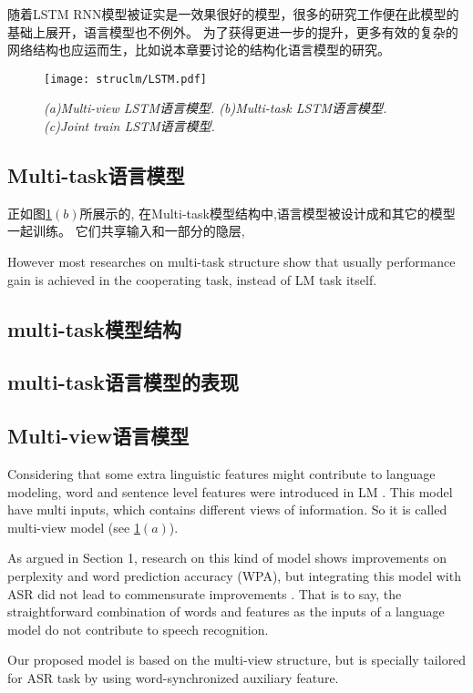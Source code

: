 随着LSTM RNN模型被证实是一效果很好的模型，很多的研究工作便在此模型的基础上展开，语言模型也不例外。
为了获得更进一步的提升，更多有效的复杂的网络结构也应运而生，比如说本章要讨论的结构化语言模型的研究。


 \begin{figure}[tbhp!]
    \small
    \centering
    \texttt{[image: struclm/LSTM.pdf]}
    \caption{{\it (a)Multi-view LSTM语言模型. (b)Multi-task LSTM语言模型. (c)Joint train LSTM语言模型.}}
    \label{fig:LSTM}
  \end{figure}
\subsection{Multi-task语言模型}
正如图\ref{fig:LSTM}$(b)$所展示的, 在Multi-task模型结构中,语言模型被设计成和其它的模型一起训练。
它们共享输入和一部分的隐层\cite{Collobert2008A}, 

However most researches on multi-task structure show that usually performance gain is achieved in the cooperating task, instead of LM task itself.


\subsection{multi-task模型结构}
\subsection{multi-task语言模型的表现}

\subsection{Multi-view语言模型}
Considering that some extra linguistic features might contribute to  language modeling, word and sentence level features were introduced in LM \cite{shi2012towards}. This model have multi inputs, which contains different views of information. So it is called multi-view model (see \ref{fig:LSTM}$(a)$).

As argued in Section 1, research on this kind of model shows improvements on perplexity and word prediction accuracy (WPA), but integrating this model with ASR did not lead to commensurate improvements \cite{shi2015integrating}.
That is to say, the straightforward combination of words and features as the inputs of a language model do not contribute to speech recognition.

Our proposed model is based on the multi-view structure, but is specially tailored for ASR task by using word-synchronized auxiliary feature.

